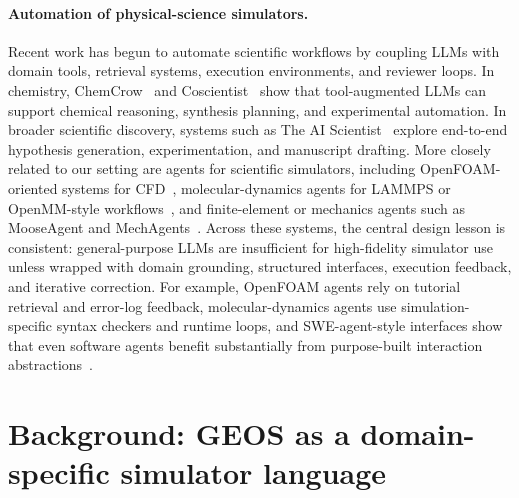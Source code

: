 \documentclass{article}
\begin{document}
\paragraph{Automation of physical-science simulators.}
Recent work has begun to automate scientific workflows by coupling LLMs with domain tools, retrieval systems, execution environments, and reviewer loops. In chemistry, ChemCrow~\cite{bran2024chemcrow} and Coscientist~\cite{boiko2023coscientist} show that tool-augmented LLMs can support chemical reasoning, synthesis planning, and experimental automation. In broader scientific discovery, systems such as The AI Scientist~\cite{lu2024aiscientist,yamada2025ai} explore end-to-end hypothesis generation, experimentation, and manuscript drafting. More closely related to our setting are agents for scientific simulators, including OpenFOAM-oriented systems for CFD~\cite{chen2024metaopenfoam,pandey2025openfoamgpt,foamagent2025}, molecular-dynamics agents for LAMMPS or OpenMM-style workflows~\cite{kim2024mdagents,shi2026mdagent2,guilbert2025dynamate,zhao2026polyjarvis}, and finite-element or mechanics agents such as MooseAgent and MechAgents~\cite{zhan2025mooseagent,ni2024mechagents}. Across these systems, the central design lesson is consistent: general-purpose LLMs are insufficient for high-fidelity simulator use unless wrapped with domain grounding, structured interfaces, execution feedback, and iterative correction. For example, OpenFOAM agents rely on tutorial retrieval and error-log feedback, molecular-dynamics agents use simulation-specific syntax checkers and runtime loops, and SWE-agent-style interfaces show that even software agents benefit substantially from purpose-built interaction abstractions~\cite{yang2024sweagent}.


\section{Background: GEOS as a domain-specific simulator language}
\label{sec:background}
\end{document}
